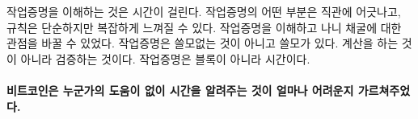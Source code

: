 \begin{comment}
Understanding proof-of-work takes time. It is often counter-intuitive,
and while the rules are simple, they lead to quite complex phenomena.
For me, shifting my perspective on mining helped. Useful, not useless.
Validation, not computation. Time, not blocks.
\end{comment}
작업증명을 이해하는 것은 시간이 걸린다.
작업증명의 어떤 부분은 직관에 어긋나고, 규칙은 단순하지만 복잡하게 느껴질 수 있다.
작업증명을 이해하고 나니 채굴에 대한 관점을 바꿀 수 있었다.
작업증명은 쓸모없는 것이 아니고 쓸모가 있다.
계산을 하는 것이 아니라 검증하는 것이다.
작업증명은 블록이 아니라 시간이다.

\paragraph{비트코인은 누군가의 도움이 없이 시간을 알려주는 것이 얼마나 어려운지 가르쳐주었다.}

%
%
%
%
%
%
%
